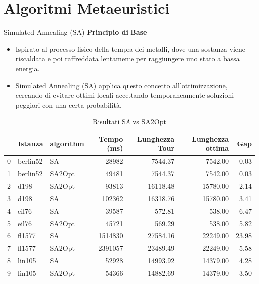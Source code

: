 \documentclass{beamer}
\begin{document}
\section{Algoritmi Metaeuristici}
\begin{frame}{Simulated Annealing (SA)}
    \textbf{Principio di Base}
    \begin{itemize}
        \item Ispirato al processo fisico della tempra dei metalli, dove una sostanza viene riscaldata e poi raffreddata lentamente per raggiungere uno stato a bassa energia.
        \item Simulated Annealing (SA) applica questo concetto all'ottimizzazione, cercando di evitare ottimi locali accettando temporaneamente soluzioni peggiori con una certa probabilità.
    \end{itemize}
    \begin{table}[H]
        \centering
        \caption{Risultati SA vs SA2Opt}
        \begin{tabular}{lllrrrr}
            \toprule
               & Istanza  & algorithm & Tempo (ms) & Lunghezza Tour & Lunghezza ottima & Gap   \\
            \midrule
            0  & berlin52 & SA        & 28982      & 7544.37        & 7542.00          & 0.03  \\
            1  & berlin52 & SA2Opt    & 49481      & 7544.37        & 7542.00          & 0.03  \\
            2  & d198     & SA2Opt    & 93813      & 16118.48       & 15780.00         & 2.14  \\
            3  & d198     & SA        & 102362     & 16318.76       & 15780.00         & 3.41  \\
            4  & eil76    & SA        & 39587      & 572.81         & 538.00           & 6.47  \\
            5  & eil76    & SA2Opt    & 45721      & 569.29         & 538.00           & 5.82  \\
            6  & fl1577   & SA        & 1514830    & 27584.16       & 22249.00         & 23.98 \\
            7  & fl1577   & SA2Opt    & 2391057    & 23489.49       & 22249.00         & 5.58  \\
            8  & lin105   & SA        & 52928      & 14993.92       & 14379.00         & 4.28  \\
            9  & lin105   & SA2Opt    & 54366      & 14882.69       & 14379.00         & 3.50  \\

\end{tabular}
\end{table}
\end{frame}
\end{document}
